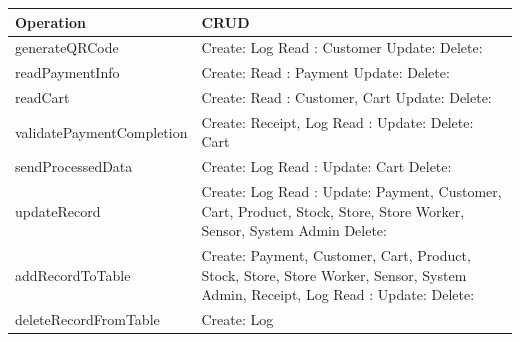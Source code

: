 \documentclass[11pt]{article}
\begin{document}
    \begin{longtable}[H]{|p{5cm}|p{9cm}|}
        \hline
        \textbf{Operation} & \textbf{CRUD} \\ \hline
        generateQRCode & 
          Create: Log \newline
          Read  : Customer \newline
          Update: \newline
          Delete: \\ \hline
        readPaymentInfo & 
          Create: \newline
          Read  : Payment \newline
          Update: \newline
          Delete: \\ \hline
        readCart & 
          Create: \newline
          Read  : Customer, Cart \newline
          Update: \newline
          Delete: \\ \hline
        validatePaymentCompletion & 
          Create: Receipt, Log \newline
          Read  : \newline
          Update: \newline
          Delete: Cart \\ \hline
        sendProcessedData & 
          Create: Log \newline
          Read  : \newline
          Update: Cart \newline
          Delete: \\ \hline
        updateRecord & 
          Create: Log \newline
          Read  : \newline
          Update: Payment, Customer, Cart, Product, Stock, Store, Store Worker, Sensor, System Admin \newline
          Delete: \\ \hline
        addRecordToTable & 
          Create: Payment, Customer, Cart, Product, Stock, Store, Store Worker, Sensor, System Admin, Receipt, Log \newline
          Read  :  \newline
          Update: \newline
          Delete: \\ \hline
        deleteRecordFromTable & 
          Create: Log \newline

\end{longtable}
\end{document}
